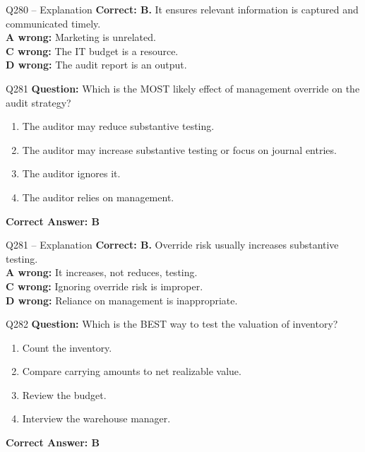 \documentclass[aspectratio=169,10pt]{beamer}
\begin{document}
	\begin{frame}[t]{Q280 -- Explanation}
		\small
		\textbf{Correct: B.} It ensures relevant information is captured and communicated timely. \\[4pt]
		\textbf{A wrong:} Marketing is unrelated. \\[2pt]
		\textbf{C wrong:} The IT budget is a resource. \\[2pt]
		\textbf{D wrong:} The audit report is an output.
	\end{frame}
	
	\begin{frame}[t]{Q281}
		\small
		\textbf{Question:} Which is the MOST likely effect of management override on the audit strategy?
		\begin{enumerate}[label=\Alph*.,itemsep=1pt,topsep=2pt]
			\item The auditor may reduce substantive testing.
			\item The auditor may increase substantive testing or focus on journal entries.
			\item The auditor ignores it.
			\item The auditor relies on management.
		\end{enumerate}
		\vspace{4pt}
		\textbf{Correct Answer: B}
	\end{frame}
	
	\begin{frame}[t]{Q281 -- Explanation}
		\small
		\textbf{Correct: B.} Override risk usually increases substantive testing. \\[4pt]
		\textbf{A wrong:} It increases, not reduces, testing. \\[2pt]
		\textbf{C wrong:} Ignoring override risk is improper. \\[2pt]
		\textbf{D wrong:} Reliance on management is inappropriate.
	\end{frame}
	
	\begin{frame}[t]{Q282}
		\small
		\textbf{Question:} Which is the BEST way to test the valuation of inventory?
		\begin{enumerate}[label=\Alph*.,itemsep=1pt,topsep=2pt]
			\item Count the inventory.
			\item Compare carrying amounts to net realizable value.
			\item Review the budget.
			\item Interview the warehouse manager.
		\end{enumerate}
		\vspace{4pt}
		\textbf{Correct Answer: B}
	\end{frame}
	
\end{document}
